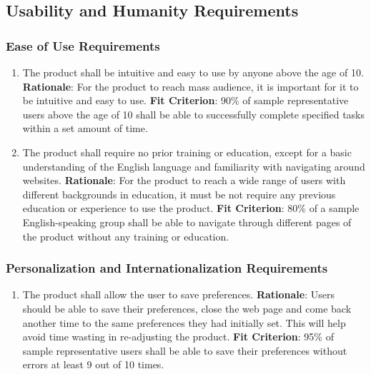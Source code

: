 \documentclass[12pt, titlepage]{article}
\begin{document}
\subsection{Usability and Humanity Requirements}
\subsubsection{Ease of Use Requirements}
\begin{enumerate}[nfr]
    \item The product shall be intuitive and easy to use by anyone above the age of 10.
    \newline \textbf{Rationale}: For the product to reach mass audience, it is important for it to be intuitive and easy to use.
    \newline \textbf{Fit Criterion}: 90\% of sample representative users above the age of 10 shall be able to successfully complete specified tasks within a set amount of time.
    \item The product shall require no prior training or education, except for a basic understanding of the English language and familiarity with navigating around websites.
    \newline \textbf{Rationale}: For the product to reach a wide range of users with different backgrounds in education, it must be not require any previous education or experience to use the product.
    \newline \textbf{Fit Criterion}: 80\% of a sample English-speaking group shall be able to navigate through different pages of the product without any training or education.
\end{enumerate}

\subsubsection{Personalization and Internationalization Requirements}
\begin{enumerate}[nfr]
    \item The product shall allow the user to save preferences.
    \newline \textbf{Rationale}: Users should be able to save their preferences, close the web page and come back another time to the same preferences they had initially set. This will help avoid time wasting in re-adjusting the product.
    \newline \textbf{Fit Criterion}: 95\% of sample representative users shall be able to save their preferences without errors at least 9 out of 10 times.
\end{enumerate}
\end{document}
